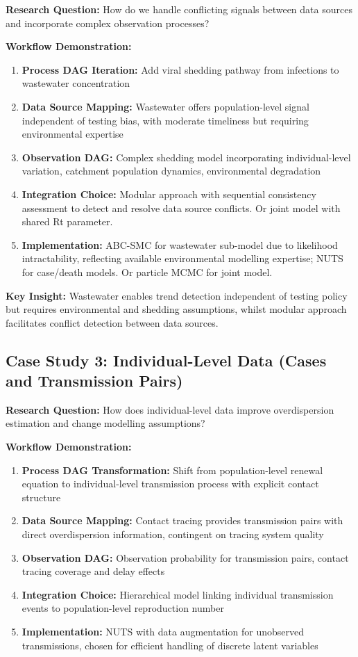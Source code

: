 \documentclass{article}
\begin{document}
\textbf{Research Question:} How do we handle conflicting signals between data sources and incorporate complex observation processes?

\textbf{Workflow Demonstration:}
\begin{enumerate}
    \item \textbf{Process DAG Iteration:} Add viral shedding pathway from infections to wastewater concentration
    \item \textbf{Data Source Mapping:} Wastewater offers population-level signal independent of testing bias, with moderate timeliness but requiring environmental expertise
    \item \textbf{Observation DAG:} Complex shedding model incorporating individual-level variation, catchment population dynamics, environmental degradation
    \item \textbf{Integration Choice:} Modular approach with sequential consistency assessment to detect and resolve data source conflicts. Or joint model with shared Rt parameter. 
    \item \textbf{Implementation:} ABC-SMC for wastewater sub-model due to likelihood intractability, reflecting available environmental modelling expertise; NUTS for case/death models. Or particle MCMC for joint model.
\end{enumerate}

\textbf{Key Insight:} Wastewater enables trend detection independent of testing policy but requires environmental and shedding assumptions, whilst modular approach facilitates conflict detection between data sources.

\subsection{Case Study 3: Individual-Level Data (Cases and Transmission Pairs)}

\textbf{Research Question:} How does individual-level data improve overdispersion estimation and change modelling assumptions?

\textbf{Workflow Demonstration:}
\begin{enumerate}
    \item \textbf{Process DAG Transformation:} Shift from population-level renewal equation to individual-level transmission process with explicit contact structure
    \item \textbf{Data Source Mapping:} Contact tracing provides transmission pairs with direct overdispersion information, contingent on tracing system quality
    \item \textbf{Observation DAG:} Observation probability for transmission pairs, contact tracing coverage and delay effects
    \item \textbf{Integration Choice:} Hierarchical model linking individual transmission events to population-level reproduction number
    \item \textbf{Implementation:} NUTS with data augmentation for unobserved transmissions, chosen for efficient handling of discrete latent variables
\end{enumerate}
\end{document}
